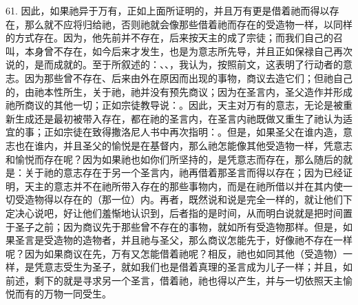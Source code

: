 61. 因此，如果祂异于万有，正如上面所证明的，并且万有更是借着祂而得以存在，那么就不应将归给祂，否则祂就会像那些借着祂而存在的受造物一样，以同样的方式存在。因为，他先前并不存在，后来按天主的成了宗徒；而我们自己的召叫，本身曾不存在，如今后来才发生，也是为意志所先导，并且正如保禄自己再次说的，是而成就的。至于所叙述的：、、，我认为，按照前文，这表明了行动者的意志。因为那些曾不存在、后来由外在原因而出现的事物，商议去造它们；但祂自己的，由祂本性所生，关于祂，祂并没有预先商议；因为在圣言内，圣父造作并形成祂所商议的其他一切；正如宗徒教导说：。因此，天主对万有的意志，无论是被重新生成还是最初被带入存在，都在祂的圣言内，在圣言内祂既做又重生了祂认为适宜的事；正如宗徒在致得撒洛尼人书中再次指明：。但是，如果圣父在谁内造，意志也在谁内，并且圣父的愉悦是在基督内，那么祂怎能像其他受造物一样，凭意志和愉悦而存在呢？因为如果祂也如你们所坚持的，是凭意志而存在，那么随后的就是：关于祂的意志存在于另一个圣言内，祂再借着那圣言而得以存在；因为已经证明，天主的意志并不在祂所带入存在的那些事物内，而是在祂所借以并在其内使一切受造物得以存在的（那一位）内。再者，既然说和说是完全一样的，就让他们下定决心说吧，好让他们羞惭地认识到，后者指的是时间，从而明白说就是把时间置于圣子之前；因为商议先于那些曾不存在的事物，就如所有受造物那样。但是，如果圣言是受造物的造物者，并且祂与圣父，那么商议怎能先于，好像祂不存在一样呢？因为如果商议在先，万有又怎能借着祂呢？相反，祂也如同其他（受造物）一样，是凭意志受生为圣子，就如我们也是借着真理的圣言成为儿子一样；并且，如前述，剩下的就是寻求另一个圣言，借着祂，祂也得以产生，并与一切依照天主愉悦而有的万物一同受生。\par

